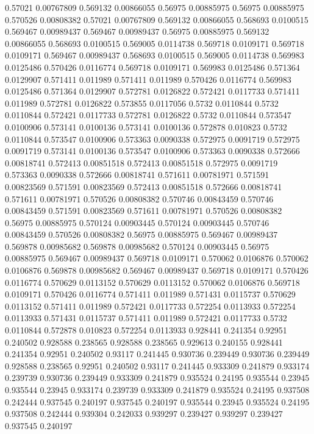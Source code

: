 0.57021 0.00767809
0.569132 0.00866055
0.56975 0.00885975
0.56975 0.00885975
0.570526 0.00808382
0.57021 0.00767809
0.569132 0.00866055
0.568693 0.0100515
0.569467 0.00989437
0.569467 0.00989437
0.56975 0.00885975
0.569132 0.00866055
0.568693 0.0100515
0.569005 0.0114738
0.569718 0.0109171
0.569718 0.0109171
0.569467 0.00989437
0.568693 0.0100515
0.569005 0.0114738
0.569983 0.0125486
0.570426 0.0116774
0.569718 0.0109171
0.569983 0.0125486
0.571364 0.0129907
0.571411 0.011989
0.571411 0.011989
0.570426 0.0116774
0.569983 0.0125486
0.571364 0.0129907
0.572781 0.0126822
0.572421 0.0117733
0.571411 0.011989
0.572781 0.0126822
0.573855 0.0117056
0.5732 0.0110844
0.5732 0.0110844
0.572421 0.0117733
0.572781 0.0126822
0.5732 0.0110844
0.573547 0.0100906
0.573141 0.0100136
0.573141 0.0100136
0.572878 0.010823
0.5732 0.0110844
0.573547 0.0100906
0.573363 0.0090338
0.572975 0.0091719
0.572975 0.0091719
0.573141 0.0100136
0.573547 0.0100906
0.573363 0.0090338
0.572666 0.00818741
0.572413 0.00851518
0.572413 0.00851518
0.572975 0.0091719
0.573363 0.0090338
0.572666 0.00818741
0.571611 0.00781971
0.571591 0.00823569
0.571591 0.00823569
0.572413 0.00851518
0.572666 0.00818741
0.571611 0.00781971
0.570526 0.00808382
0.570746 0.00843459
0.570746 0.00843459
0.571591 0.00823569
0.571611 0.00781971
0.570526 0.00808382
0.56975 0.00885975
0.570124 0.00903445
0.570124 0.00903445
0.570746 0.00843459
0.570526 0.00808382
0.56975 0.00885975
0.569467 0.00989437
0.569878 0.00985682
0.569878 0.00985682
0.570124 0.00903445
0.56975 0.00885975
0.569467 0.00989437
0.569718 0.0109171
0.570062 0.0106876
0.570062 0.0106876
0.569878 0.00985682
0.569467 0.00989437
0.569718 0.0109171
0.570426 0.0116774
0.570629 0.0113152
0.570629 0.0113152
0.570062 0.0106876
0.569718 0.0109171
0.570426 0.0116774
0.571411 0.011989
0.571431 0.0115737
0.570629 0.0113152
0.571411 0.011989
0.572421 0.0117733
0.572254 0.0113933
0.572254 0.0113933
0.571431 0.0115737
0.571411 0.011989
0.572421 0.0117733
0.5732 0.0110844
0.572878 0.010823
0.572254 0.0113933
0.928441 0.241354
0.92951 0.240502
0.928588 0.238565
0.928588 0.238565
0.929613 0.240155
0.928441 0.241354
0.92951 0.240502
0.93117 0.241445
0.930736 0.239449
0.930736 0.239449
0.928588 0.238565
0.92951 0.240502
0.93117 0.241445
0.933309 0.241879
0.933174 0.239739
0.930736 0.239449
0.933309 0.241879
0.935524 0.24195
0.935544 0.23945
0.935544 0.23945
0.933174 0.239739
0.933309 0.241879
0.935524 0.24195
0.937508 0.242444
0.937545 0.240197
0.937545 0.240197
0.935544 0.23945
0.935524 0.24195
0.937508 0.242444
0.939304 0.242033
0.939297 0.239427
0.939297 0.239427
0.937545 0.240197
